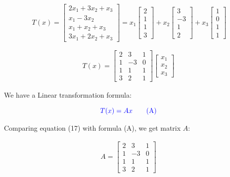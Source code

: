 \documentclass[a4paper]{report}
\begin{document}
\[\ T(x)  = \begin{bmatrix}
    2x_1+3x_2+x_3 \\
    x_1-3x_2 \\
    x_1+x_2+x_3 \\
    3x_1+2x_2+x_3
\end{bmatrix} = x_1\begin{bmatrix}
    2 \\
    1 \\
    1 \\
    3 
\end{bmatrix} +x_2 \begin{bmatrix}
    3 \\-3 \\ 1\\2
\end{bmatrix} +x_3 \begin{bmatrix}
    1\\0\\1\\1
\end{bmatrix} \]

\begin{align}
    T(x)=\begin{bmatrix}
    2&3&1 \\
    1&-3&0 \\
    1&1&1 \\
    3&2&1
\end{bmatrix} \begin{bmatrix}
    x_1\\x_2\\x_3
\end{bmatrix} 
\end{align}

\vspace{5mm}
We have a Linear transformation formula:

\begin{equation}
    \color{blue} T(x) = Ax \tag{A}
\end{equation}

Comparing equation (17) with formula (A), we get matrix $A$:

\begin{align}  A = \begin{bmatrix}
    2&3&1 \\
    1&-3&0 \\
    1&1&1 \\
    3&2&1
\end{bmatrix} \end{align}
\end{document}
